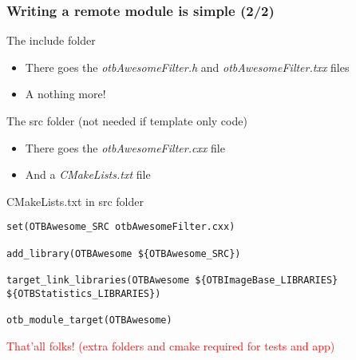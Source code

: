 \documentclass[8pt]{beamer}
\begin{document}
\begin{frame}[fragile]
\frametitle{Writing a remote module is simple (2/2)}
\begin{block}{The include folder}
\begin{itemize}
\item There goes the \textit{otbAwesomeFilter.h} and \textit{otbAwesomeFilter.txx} files
\item A nothing more!
\end{itemize}
\end{block}

\begin{block}{The src folder (not needed if template only code)}
\begin{itemize}
\item There goes the \textit{otbAwesomeFilter.cxx} file
\item And a \textit{CMakeLists.txt} file
\end{itemize}
\end{block}


\begin{block}{CMakeLists.txt in src folder}
\begin{small}
\begin{verbatim}
set(OTBAwesome_SRC otbAwesomeFilter.cxx)

add_library(OTBAwesome ${OTBAwesome_SRC})

target_link_libraries(OTBAwesome ${OTBImageBase_LIBRARIES} ${OTBStatistics_LIBRARIES})

otb_module_target(OTBAwesome)
\end{verbatim}
\end{small}
\end{block}

\textcolor{red}{That'all folks! (extra folders and cmake required for tests and app)}

\end{frame}
\end{document}
